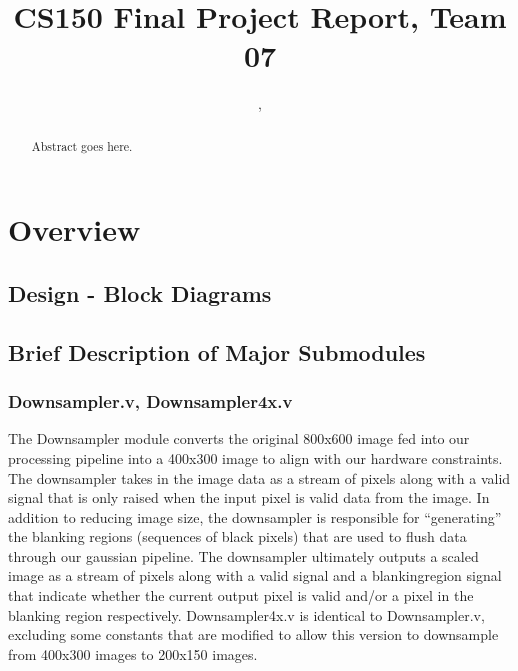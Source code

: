\documentclass[12pt]{article}
\title{CS150 Final Project Report, Team 07}
\author{\Name, \texttt{\Login}}
\begin{document}
\maketitle



\begin{abstract}

Abstract goes here.

\end{abstract}

\newpage

\section{Overview}

\subsection{Design - Block Diagrams}

\subsection{Brief Description of Major Submodules}

\subsubsection{Downsampler.v, Downsampler4x.v}
The Downsampler module converts the original 800x600 image fed into our processing
pipeline into a 400x300 image to align with our hardware constraints. The downsampler
takes in the image data as a stream of pixels along with a valid signal that is
only raised when the input pixel is valid data from the image. In addition to 
reducing image size, the downsampler is responsible for ``generating'' the 
blanking regions (sequences of black pixels) that are used to flush data 
through our gaussian pipeline. The downsampler ultimately outputs a scaled 
image as a stream of pixels along with a valid signal and a blankingregion 
signal that indicate whether the current output pixel is valid and/or a pixel
in the blanking region respectively. Downsampler4x.v is identical to 
Downsampler.v, excluding some constants that are modified to allow this version 
to downsample from 400x300 images to 200x150 images.
\end{document}
